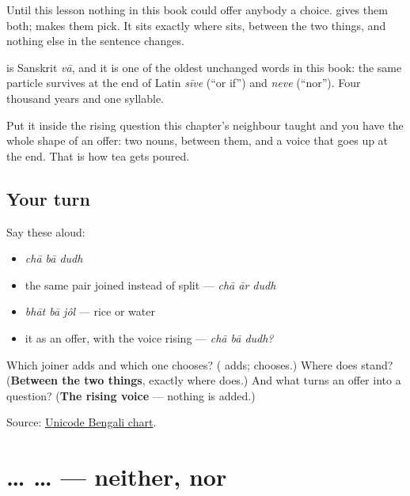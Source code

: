 Until this lesson nothing in this book could offer anybody a choice. \textbf{} gives them both; \textbf{} makes them pick. It sits exactly where \textbf{} sits, between the two things, and nothing else in the sentence changes.

\begin{cousinweb}
\textbf{} is Sanskrit \emph{vā}, and it is one of the oldest unchanged words in this book: the same particle survives at the end of Latin \emph{sīve} (\textquotedblleft{}or if\textquotedblright{}) and \emph{neve} (\textquotedblleft{}nor\textquotedblright{}). Four thousand years and one syllable.

Put it inside the rising question this chapter's neighbour taught and you have the whole shape of an offer: two nouns, \textbf{} between them, and a voice that goes up at the end. That is how tea gets poured.
\end{cousinweb}

\subsection*{Your turn}
Say these aloud:

\begin{itemize}
\raggedright
  \item \emph{chā bā dudh}
  \item the same pair joined instead of split — \emph{chā ār dudh}
  \item \emph{bhāt bā jôl} — rice or water
  \item it as an offer, with the voice rising — \emph{chā bā dudh?}
\end{itemize}

\begin{tcolorbox}[breakable,colback=teal!4,colframe=teal!35!black,title={Before you move on}]
Which joiner adds and which one chooses? (\textbf{} adds; \textbf{} chooses.) Where does \textbf{} stand? (\textbf{Between the two things}, exactly where \textbf{} does.) And what turns an offer into a question? (\textbf{The rising voice} — nothing is added.)

Source: \href{https://www.unicode.org/charts/PDF/U0980.pdf}{Unicode Bengali chart}.
\end{tcolorbox}
\section[\texorpdfstring{\bn{না} … \bn{না} … (nā … nā …)}{না … না … (nā … nā …)}]{ …  … — neither, nor}


